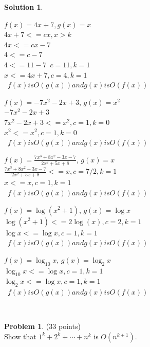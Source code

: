 \documentclass{article}
\theoremstyle{definition}
\newtheorem{problem}{Problem}
\newtheorem*{solution}{Solution}
\begin{document}
\begin{solution}\ \\
\begin{compactenum}


\item $f(x) = 4x+7 , g(x) = x$\ \\
$4x+7 <= cx , x>k$\ \\
$4x <= cx - 7 $\ \\
$4 <= c-7$\ \\
$4<=11-7$\ $c=11,k=1$\ \\
$ x <= 4x + 7 , c=4 , k=1 $\ \\
\therefore \  $f(x) is O(g(x)) and g(x) is O(f(x))$\ \\

\item $f(x) = -7x^2 - 2x + 3$, $g(x) = x^2$\ \\
$-7x^2 - 2x + 3$\ \\
$7x^2 - 2x + 3 <= x^2 , c=1, k=0$\ \\
$x^2 <= x^2 , c=1, k=0$\ \\
\therefore \  $f(x) is O(g(x)) and g(x) is O(f(x))$\ \\

\item $\displaystyle f(x) = \frac{7x^3 + 8x^2 - 3x - 7}{2x^2 + 5x + 8}$, $g(x) = x$\ \\
$\displaystyle \frac{7x^3 + 8x^2 - 3x - 7}{2x^2 + 5x + 8} <= x ,c= 7/2 , k= 1$\ \\
$x <= x, c=1 , k=1$\ \\
\therefore \  $f(x) is O(g(x)) and g(x) is O(f(x))$\ \\

\item $f(x) = \log (x^2+1)$, $g(x) = \log x$\ \\
$\log (x^2+1) <= 2 \log (x), c = 2, k = 1$\ \\
$\log x <= \log x , c = 1, k = 1$\ \\
\therefore \  $f(x) is O(g(x)) and g(x) is O(f(x))$\ \\

\item $f(x) = \log_{10} x$, $g(x) = \log_2 x$\ \\
$ \log_{10} x <= \log x, c = 1, k = 1$\ \\
$ \log_{2} x <= \log x, c =1, k = 1$\ \\
\therefore \  $f(x) is O(g(x)) and g(x) is O(f(x))$\ \\

\end{compactenum}
\end{solution}
\ \\
\begin{problem}(33 points)\\ 
Show that $1^k + 2^k + \cdots + n^k$ is $O(n^{k+1})$.
\end{problem}
\end{document}
